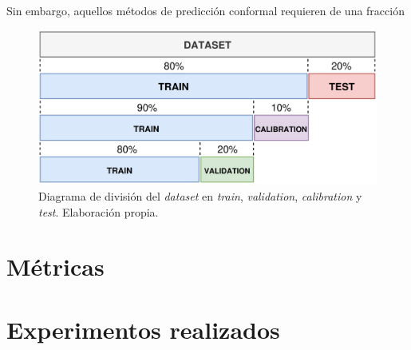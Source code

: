 Sin embargo, aquellos métodos de predicción conformal requieren de una fracción 

\begin{figure}[h]
    \centering
    \includegraphics[width=\textwidth]{capitulos/cap_04/imagenes/data_split_conformal.png}
    \caption[
        Diagrama de división del \textit{dataset} en \textit{train}, \textit{validation}, \textit{calibration} 
        y \textit{test}.
    ]{
        Diagrama de división del \textit{dataset} en \textit{train}, \textit{validation}, \textit{calibration}
        y \textit{test}. Elaboración propia.
    } 
    \label{fig:data_split_conformal}
\end{figure}




\section{Métricas}






\section{Experimentos realizados}


